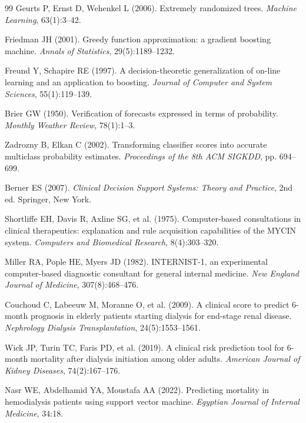 \documentclass[12pt,a4paper,twoside]{report}
\begin{document}
\begin{thebibliography}{99}
Geurts P, Ernst D, Wehenkel L (2006).
\newblock Extremely randomized trees.
\newblock \textit{Machine Learning}, 63(1):3--42.

Friedman JH (2001).
\newblock Greedy function approximation: a gradient boosting machine.
\newblock \textit{Annals of Statistics}, 29(5):1189--1232.

Freund Y, Schapire RE (1997).
\newblock A decision-theoretic generalization of on-line learning and an application to boosting.
\newblock \textit{Journal of Computer and System Sciences}, 55(1):119--139.

Brier GW (1950).
\newblock Verification of forecasts expressed in terms of probability.
\newblock \textit{Monthly Weather Review}, 78(1):1--3.

Zadrozny B, Elkan C (2002).
\newblock Transforming classifier scores into accurate multiclass probability estimates.
\newblock \textit{Proceedings of the 8th ACM SIGKDD}, pp. 694--699.

Berner ES (2007).
\newblock \textit{Clinical Decision Support Systems: Theory and Practice}, 2nd ed.
\newblock Springer, New York.

Shortliffe EH, Davis R, Axline SG, et al. (1975).
\newblock Computer-based consultations in clinical therapeutics: explanation and rule acquisition capabilities of the MYCIN system.
\newblock \textit{Computers and Biomedical Research}, 8(4):303--320.

Miller RA, Pople HE, Myers JD (1982).
\newblock INTERNIST-1, an experimental computer-based diagnostic consultant for general internal medicine.
\newblock \textit{New England Journal of Medicine}, 307(8):468--476.

Couchoud C, Labeeuw M, Moranne O, et al. (2009).
\newblock A clinical score to predict 6-month prognosis in elderly patients starting dialysis for end-stage renal disease.
\newblock \textit{Nephrology Dialysis Transplantation}, 24(5):1553--1561.

Wick JP, Turin TC, Faris PD, et al. (2019).
\newblock A clinical risk prediction tool for 6-month mortality after dialysis initiation among older adults.
\newblock \textit{American Journal of Kidney Diseases}, 74(2):167--176.

Nasr WE, Abdelhamid YA, Moustafa AA (2022).
\newblock Predicting mortality in hemodialysis patients using support vector machine.
\newblock \textit{Egyptian Journal of Internal Medicine}, 34:18.


\end{thebibliography}
\end{document}
